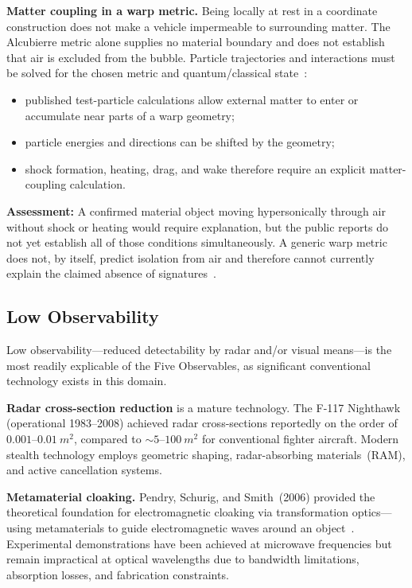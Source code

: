 \documentclass[aps,prd,twocolumn,superscriptaddress,nofootinbib,floatfix]{revtex4-2}
\begin{document}
\textbf{Matter coupling in a warp metric.} Being locally at rest in a coordinate
construction does not make a vehicle impermeable to surrounding matter. The
Alcubierre metric alone supplies no material boundary and does not establish that
air is excluded from the bubble. Particle trajectories and interactions must be
solved for the chosen metric and quantum/classical state~\cite{Alcubierre1994}:
\begin{itemize}
  \item published test-particle calculations allow external matter to enter or
        accumulate near parts of a warp geometry;
  \item particle energies and directions can be shifted by the geometry;
  \item shock formation, heating, drag, and wake therefore require an explicit
        matter-coupling calculation.
\end{itemize}

\textbf{Assessment:} A confirmed material object moving hypersonically through air
without shock or heating would require explanation, but the public reports do not
yet establish all of those conditions simultaneously. A generic warp metric does
not, by itself, predict isolation from air and therefore cannot currently explain
the claimed absence of signatures~\cite{Alcubierre1994}.

\subsection{Low Observability}\label{sec:low-observability}

Low observability---reduced detectability by radar and/or visual means---is the
most readily explicable of the Five Observables, as significant conventional
technology exists in this domain.

\textbf{Radar cross-section reduction} is a mature technology. The F-117 Nighthawk
(operational 1983--2008) achieved radar cross-sections reportedly on the order of
$0.001$--$\SI{0.01}{m^{2}}$, compared to ${\sim}5$--$\SI{100}{m^{2}}$ for
conventional fighter aircraft. Modern stealth technology employs geometric
shaping, radar-absorbing materials~(RAM), and active cancellation systems.

\textbf{Metamaterial cloaking.} Pendry, Schurig, and Smith~(2006) provided the
theoretical foundation for electromagnetic cloaking via transformation
optics---using metamaterials to guide electromagnetic waves around an
object~\cite{PendrySchurig2006}. Experimental demonstrations have been achieved at
microwave frequencies but remain impractical at optical wavelengths due to
bandwidth limitations, absorption losses, and fabrication constraints.
\end{document}
